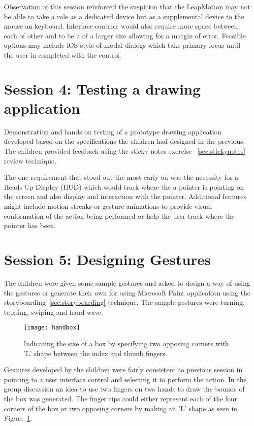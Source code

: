 Observation of this session reinforced the suspicion that the LeapMotion may not be able to take a role as a dedicated device but as a supplemental device to the mouse an keyboard. Interface controls would also require more space between each of other and to be a of a larger size allowing for a margin of error. Feasible options may include iOS style of modal dialogs which take primary focus until the user in completed with the control. 

\section{Session 4: Testing a drawing application}\label{session4}

Demonstration and hands on testing of a prototype drawing application developed based on the specifications the children had designed in the previous. The children provided feedback using the sticky notes exercise ~\ref{sec:stickynotes} review technique. 

The one requirement that stood out the most early on was the necessity for a Heads Up Display (HUD) which would track where the a pointer is pointing on the screen and also display and interaction with the pointer. Additional features might include motion streaks or gesture animations to provide visual conformation of the action being performed or help the user track where the pointer has been. 



\section{Session 5: Designing Gestures }\label{session5}

The children were given some sample gestures and asked to design a way of using the gestures or generate their own for using Microsoft Paint application using the storyboarding~\ref{sec:storyboarding} technique. The sample gestures were turning, tapping, swiping and hand wave. 
\begin{figure}
\centering
\texttt{[image: handbox]}
\caption{Indicating the size of a box by specifying two opposing corners with 'L' shape between the index and thumb fingers.}
\label{fig:handbox}
\end{figure}
Gestures developed by the children were fairly consistent to previous session in pointing to a user interface control and selecting it to perform the action. In the group discussion an idea to use two fingers on two hands to draw the bounds of the box was generated. The finger tips could either represent each of the four corners of the box or two opposing corners by making an 'L' shape as seen in Figure~\ref{fig:handbox}. 

